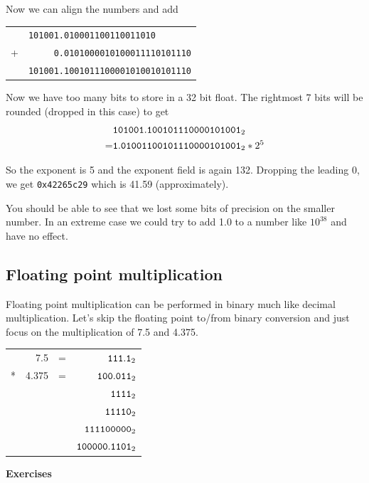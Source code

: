 \documentclass[11pt,b5paper]{book}
\begin{document}
Now we can align the numbers and add

\begin{tabular}{ll}
    & {\tt 101001.010001100110011010} \\
  + & {\tt \ \ \ \ \ 0.0101000010100011110101110}\\
  \hline
    & {\tt 101001.1001011100001010010101110}
\end{tabular}

Now we have too many bits to store in a 32 bit float.
The rightmost 7 bits will be rounded (dropped in this case) to get
\begin{align*}
    & {\tt 101001.100101110000101001}_2 \\
  = & {\tt 1.01001100101110000101001}_2 * 2^5
\end{align*}

So the exponent is 5 and the exponent field is again 132.
Dropping the leading 0, we get {\tt 0x42265c29} which is 41.59 (approximately).

You should be able to see that we lost some bits of precision on the smaller number.
In an extreme case we could try to add 1.0 to a number like $10^{38}$ and have no effect.

\subsection{Floating point multiplication}

Floating point multiplication can be performed in binary much like decimal multiplication.
Let's skip the floating point to/from binary conversion and just focus on the multiplication of
7.5 and 4.375.

\begin{center}
\begin{tabular}{crcr}
   &  7.5 & = & ${\tt 111.1}_2$ \\ 
 * &  4.375 & = & ${\tt 100.011}_2$ \\
    \hline
   &       &   & ${\tt 1111}_2$ \\
   &       &   & ${\tt 11110}_2$ \\
   &       &   & ${\tt 111100000}_2$ \\
   \hline
    &       &   & ${\tt 100000.1101}_2$
\end{tabular}
\end{center}


\vfill
\break
{\bf\large Exercises}
\end{document}
